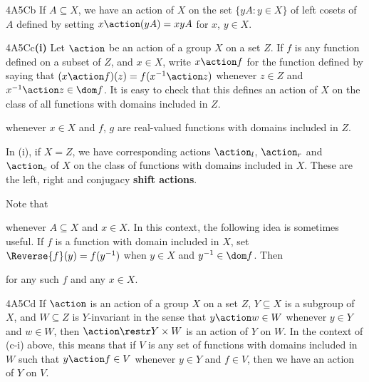 \spheader 4A5Cb If $A\subseteq X$, we have an action of $X$ on the set
$\{yA:y\in X\}$ of left cosets of $A$ 
defined by setting $x\action(yA)=xyA$ for $x$, $y\in X$.

\spheader 4A5Cc{\bf (i)} 
Let $\action$ be an action of a
group $X$ on a set $Z$.   If $f$ is any function defined on a subset of
$Z$, and $x\in X$, write $x\action f$ for the function defined by saying
that $(x\action f)(z)=f(x^{-1}\action z)$ whenever $z\in Z$ and
$x^{-1}\action z\in\dom f$.   It is easy to check that this defines an
action of $X$ on the class of all functions with domains included in
$Z$.   


\noindent whenever $x\in X$ and
$f$, $g$ are real-valued functions with domains included
in $Z$.

\medskip

 In (i), if $X=Z$, we have
corresponding actions $\action_l$, $\action_r$ and $\action_c$ of
$X$ on the class of functions with domains included in $X$.   These are the left, right and
conjugacy {\bf shift actions}.

Note that 


\noindent whenever $A\subseteq X$ and $x\in X$.   
In this context, the following idea is sometimes useful.   If $f$ is a
function with domain included in $X$, set $\Reverse{f}(y)=f(y^{-1})$
when $y\in X$ and $y^{-1}\in\dom f$.   Then


\noindent for any such $f$ and any $x\in X$.

\spheader 4A5Cd
If $\action$ is an action of a group $X$ on a set $Z$,
$Y\subseteq X$ is a subgroup of $X$,
and $W\subseteq Z$ is $Y$-invariant in the sense that
$y\action w\in W$ whenever $y\in Y$ and $w\in W$, then
$\action\restr Y\times W$ is an action of $Y$ on $W$.   In the context
of (c-i) above, this means that if $V$ is any set of functions with
domains included in $W$ such that $y\action f\in V$ whenever $y\in Y$
and $f\in V$, then we have an action of $Y$ on $V$.

